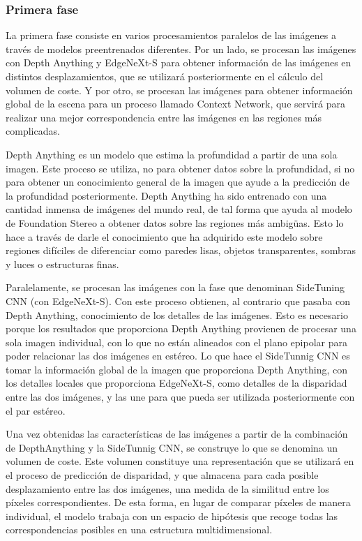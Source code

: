 \subsubsection{Primera fase}
La primera fase consiste en varios procesamientos paralelos de las imágenes a través de modelos preentrenados diferentes. Por un lado, se procesan las imágenes con Depth Anything y EdgeNeXt-S para obtener información de las imágenes en distintos desplazamientos, que se utilizará posteriormente en el cálculo del volumen de coste. Y por otro, se procesan las imágenes para obtener información global de la escena para un proceso llamado Context Network, que servirá para realizar una mejor correspondencia entre las imágenes en las regiones más complicadas. 

Depth Anything es un modelo que estima la profundidad a partir de una sola imagen. Este proceso se utiliza, no para obtener datos sobre la profundidad, si no para obtener un conocimiento general de la imagen que ayude a la predicción de la profundidad posteriormente. Depth Anything ha sido entrenado con una cantidad inmensa de imágenes del mundo real, de tal forma que ayuda al modelo de Foundation Stereo a obtener datos sobre las regiones más ambigüas. Esto lo hace a través de darle el conocimiento que ha adquirido este modelo sobre regiones difíciles de diferenciar como paredes lisas, objetos transparentes, sombras y luces o estructuras finas.

Paralelamente, se procesan las imágenes con la fase que denominan SideTuning CNN (con EdgeNeXt-S). Con este proceso obtienen, al contrario que pasaba con Depth Anything, conocimiento de los detalles de las imágenes. Esto es necesario porque los resultados que proporciona Depth Anything provienen de procesar una sola imagen individual, con lo que no están alineados con el plano epipolar para poder relacionar las dos imágenes en estéreo. Lo que hace el SideTunnig CNN es tomar la información global de la imagen que proporciona Depth Anything, con los detalles locales que proporciona EdgeNeXt-S, como detalles de la disparidad entre las dos imágenes, y las une para que pueda ser utilizada posteriormente con el par estéreo.

Una vez obtenidas las características de las imágenes a partir de la combinación de DepthAnything y la SideTunnig CNN, se construye lo que se denomina un volumen de coste. Este volumen constituye una representación que se utilizará en el proceso de predicción de disparidad, y que almacena para cada posible desplazamiento entre las dos imágenes, una medida de la similitud entre los píxeles correspondientes. De esta forma, en lugar de comparar píxeles de manera individual, el modelo trabaja con un espacio de hipótesis que recoge todas las correspondencias posibles en una estructura multidimensional.

